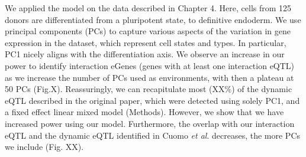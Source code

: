 We applied the model on the data described in Chapter 4.
Here, cells from 125 donors are differentiated from a pluripotent state, to definitive endoderm. 
We use 
principal components (PCs) 
to capture various aspects of the variation in gene expression in the dataset, which represent cell states and types. 
In particular, PC1 nicely aligns with the differentiation axis. 
We observe an increase in our power to identify interaction eGenes (genes with at least one interaction eQTL) as we increase the number of PCs used as environments, with then a plateau at 50 PCs (Fig.X).
Reassuringly, we can recapitulate most (XX\%) of the dynamic eQTL described in the original paper, which were detected using solely PC1, and a fixed effect linear mixed model (Methods). 
However, we show that we have increased power using our model. 
Furthermore, the overlap with our interaction eQTL and the dynamic eQTL identified in Cuomo \textit{et al}. decreases, the more PCs we include (Fig. XX).\\















